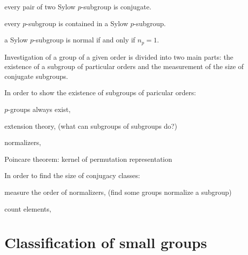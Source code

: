 \documentclass{../note}
\begin{document}
\begin{parts}
\item every pair of two Sylow $p$-subgroup is conjugate.
\item every $p$-subgroup is contained in a Sylow $p$-subgroup.
\item a Sylow $p$-subgroup is normal if and only if $n_p=1$.
\end{parts}

Investigation of a group of a given order is divided into two main parts: the existence of a subgroup of particular orders and the measurement of the size of conjugate subgroups.

In order to show the existence of subgroups of paricular orders:
\begin{parts}
\item $p$-groups always exist,
\item extension theory, (what can subgroups of subgroups do?)
\item normalizers,
\item Poincare theorem: kernel of permutation representation
\end{parts}

In order to find the size of conjugacy classes:
\begin{parts}
\item measure the order of normalizers, (find some groups normalize a subgroup)
\item count elements,
\end{parts}




\section{Classification of small groups}

\begin{prb}
\end{prb}

\begin{prb}
\end{prb}

\begin{prb}
\end{prb}
\end{document}
